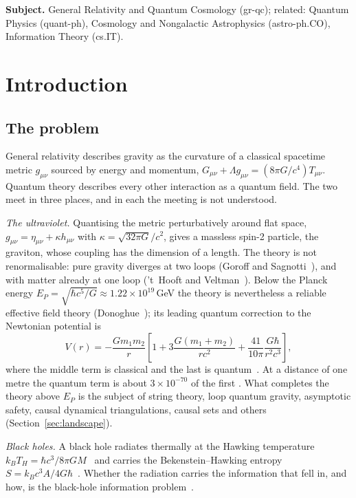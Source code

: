 \documentclass[11pt,a4paper]{article}
\begin{document}
\noindent\textbf{Subject.} General Relativity and Quantum Cosmology (gr-qc); related: Quantum Physics (quant-ph), Cosmology and Nongalactic
Astrophysics (astro-ph.CO), Information Theory (cs.IT).

\tableofcontents

\section{Introduction}\label{sec:intro}

\subsection{The problem}

General relativity describes gravity as the curvature of a classical spacetime metric $g_{\mu\nu}$ sourced by energy and momentum,
$G_{\mu\nu}+\Lambda g_{\mu\nu}=(8\pi G/c^4)T_{\mu\nu}$. Quantum theory describes every other interaction as a quantum field. The two
meet in three places, and in each the meeting is not understood.

\emph{The ultraviolet.} Quantising the metric perturbatively around flat space, $g_{\mu\nu}=\eta_{\mu\nu}+\kappa h_{\mu\nu}$ with
$\kappa=\sqrt{32\pi G}/c^2$, gives a massless spin-2 particle, the graviton, whose coupling has the dimension of a length. The theory is
not renormalisable: pure gravity diverges at two loops (Goroff and Sagnotti~\cite{goroff}), and with matter already at one loop ('t~Hooft and
Veltman~\cite{thooftveltman}). Below the Planck energy $E_P=\sqrt{\hbar c^5/G}\approx1.22\times10^{19}$\,GeV the theory is nevertheless a
reliable effective field theory (Donoghue~\cite{donoghue}); its leading quantum correction to the Newtonian potential is
\begin{equation}\label{eq:eft}
V(r)=-\frac{Gm_1m_2}{r}\left[1+3\frac{G(m_1+m_2)}{rc^2}+\frac{41}{10\pi}\frac{G\hbar}{r^2c^3}\right],
\end{equation}
where the middle term is classical and the last is quantum~\cite{bdh}. At a distance of one metre the quantum term is about
$3\times10^{-70}$ of the first . What completes the theory above $E_P$ is the subject of string theory, loop quantum gravity,
asymptotic safety, causal dynamical triangulations, causal sets and others (Section~\ref{sec:landscape}).

\emph{Black holes.} A black hole radiates thermally at the Hawking temperature $k_BT_H=\hbar c^3/8\pi GM$~\cite{hawking75} and carries the
Bekenstein--Hawking entropy $S=k_Bc^3A/4G\hbar$~\cite{bekenstein73}. Whether the radiation carries the information that fell in, and how,
is the black-hole information problem~\cite{page93,penington,aemm}.
\end{document}
